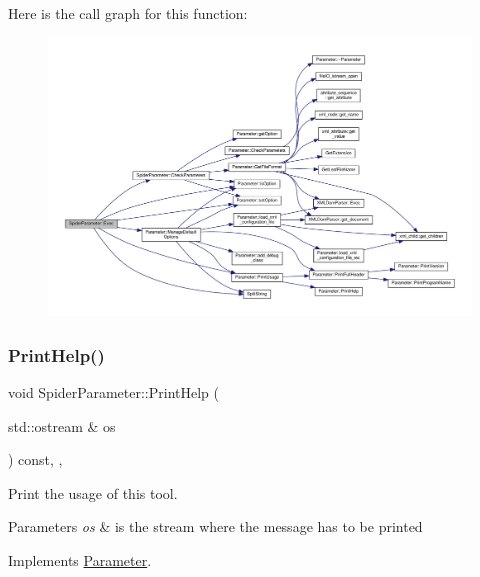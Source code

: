 Here is the call graph for this function\+:
\nopagebreak
\begin{figure}[H]
\begin{center}
\leavevmode
\includegraphics[width=350pt]{dc/d95/classSpiderParameter_a88ccb6e00f3a60b59e6ecb82e3f1b76d_cgraph}
\end{center}
\end{figure}
\mbox{\label{classSpiderParameter_a8021f729e9e68cdacaa9ae2105b565ba}} 
\subsubsection{\texorpdfstring{Print\+Help()}{PrintHelp()}}
{\footnotesize\ttfamily void Spider\+Parameter\+::\+Print\+Help (\begin{DoxyParamCaption}\item[{std\+::ostream \&}]{os }\end{DoxyParamCaption}) const\hspace{0.3cm}{\ttfamily [override]}, {\ttfamily [private]}, {\ttfamily [virtual]}}



Print the usage of this tool. 


\begin{DoxyParams}{Parameters}
{\em os} & is the stream where the message has to be printed \\
\hline
\end{DoxyParams}


Implements \hyperlink{classParameter_a804e04bcbc2eca07deed52e112fa3321}{Parameter}.



